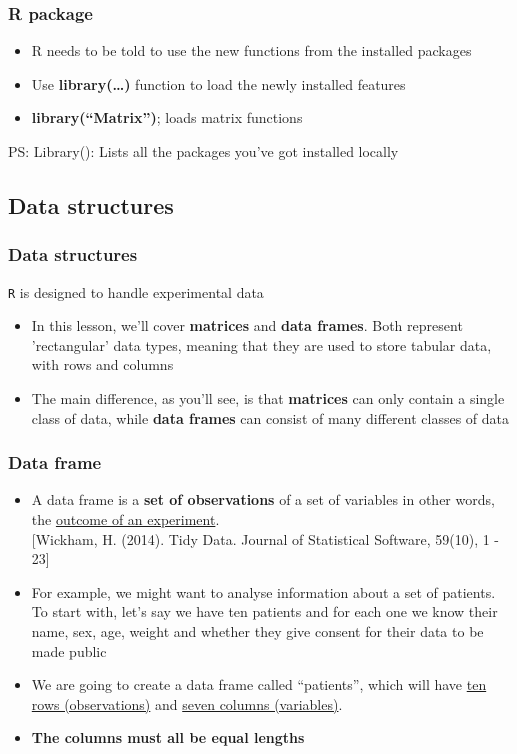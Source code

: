 \documentclass{beamer}
\begin{document}
\begin{frame}[fragile]
	\frametitle{R package}
	\begin{itemize}
	\small
		\item R needs to be told to use the new functions from the installed packages 
		\item Use \textbf{library(\ldots)} function to load the newly installed features
		\item \textbf{library(``Matrix'')};  loads matrix functions
	\end{itemize}
	\footnotesize PS: Library(): Lists all the packages you've got installed locally
\end{frame}


\subsection{Data structures}


\begin{frame}[fragile]
	\frametitle{Data structures}
	\centering \LARGE \texttt{R} is designed to handle experimental data
	\begin{itemize}
		\small
		\item In this lesson, we'll cover \textbf{matrices} and \textbf{data frames}. Both represent 'rectangular' data types, meaning that they are used to store tabular data, with rows and columns
		\item The main difference, as you'll see, is that \textbf{matrices} can only contain a single class of data, while \textbf{data frames} can consist of many different classes of data
	\end{itemize}
\end{frame}

\begin{frame}[fragile]
	\frametitle{Data frame}
	\begin{itemize}
		\small
		\item A data frame is a \textbf{set of observations} of a set of variables  in other words, the \underline{outcome of an experiment}.\\ 
			\tiny [Wickham, H. (2014). Tidy Data. Journal of Statistical Software, 59(10), 1 - 23] 

		\small
		\item For example, we might want to analyse information about a set of patients. To start with, let's say we have ten patients and for each one we know their name, sex, age, weight and whether they give consent for their data to be made public
		\item We are going to create a data frame called ``patients'', which will have \underline{ten rows (observations)} and \underline{seven columns (variables)}. 
		\item \textbf{The columns must all be equal lengths}

	\end{itemize}
\end{frame}
\end{document}
